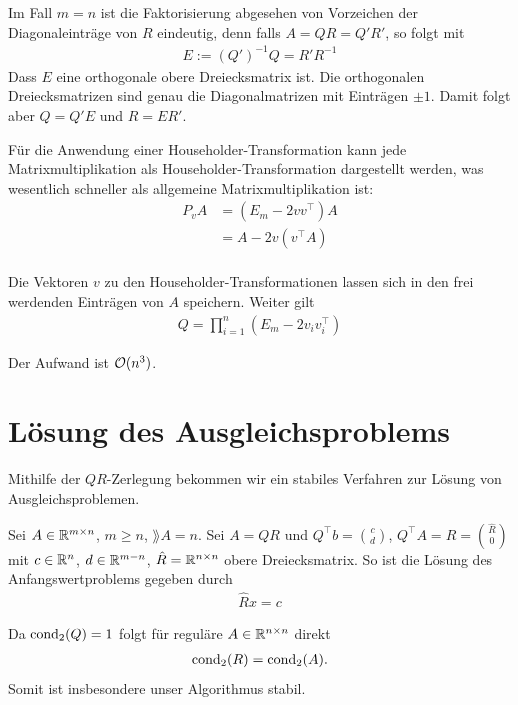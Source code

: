 \documentclass{report}
\begin{document}
\begin{anmerkung}
	Im Fall $m = n$ ist die Faktorisierung abgesehen von Vorzeichen der Diagonaleinträge von $R$ eindeutig, denn falls $A = QR = Q'R'$, so folgt mit
	\begin{align*}
		E := (Q')^{-1}Q = R'R^{-1}
	\end{align*}
	Dass $E$ eine orthogonale obere Dreiecksmatrix ist. Die orthogonalen Dreiecksmatrizen sind genau die Diagonalmatrizen mit Einträgen $\pm 1$. Damit folgt aber $Q = Q'E$ und $R = ER'$.
\end{anmerkung}
\begin{anmerkung}
	Für die Anwendung einer Householder-Transformation kann jede Matrixmultiplikation als Householder-Transformation dargestellt werden, was wesentlich schneller als allgemeine Matrixmultiplikation ist:
	\begin{align*}
		P_vA &= (E_m - 2vv^\top)A\\ 
			   &= A - 2v(v^\top A)\\
	\end{align*}
\end{anmerkung}
\begin{anmerkung}
	Die Vektoren $v$ zu den Householder-Transformationen lassen sich in den frei werdenden Einträgen von $A$ speichern. Weiter gilt
	\begin{align*}
		Q = \prod_{i = 1}^n (E_m - 2v_i v_i^\top)
	\end{align*}
\end{anmerkung}
\begin{anmerkung}
	Der Aufwand ist $\mathcal{O}(n^3)$.
\end{anmerkung}
\section{Lösung des Ausgleichsproblems}
Mithilfe der $QR$-Zerlegung bekommen wir ein stabiles Verfahren zur Lösung von Ausgleichsproblemen.
\begin{theorem}
	Sei $A \in \mathbb{R}^{m \times n}$, $m \geq n$, $\rang A = n$. Sei $A = QR$ und $Q^\top b = \binom{c}{d}$, $Q^\top A = R = \binom{\hat R}{0}$ mit $c \in \mathbb{R}^n$, $d \in \mathbb{R}^{m-n}$, $\hat R = \mathbb{R}^{n \times n}$ obere Dreiecksmatrix. So ist die Lösung des Anfangswertproblems gegeben durch
	\begin{align*}
		\hat R x = c
	\end{align*}
\end{theorem}
\begin{anmerkung}
	Da $\textnormal{cond}_2(Q) = 1$ folgt für reguläre $A \in \mathbb{R}^{n \times n}$ direkt 
	\begin{align*}
		\textnormal{cond}_2(R) = \textnormal{cond}_2(A).
	\end{align*}
	Somit ist insbesondere unser Algorithmus stabil.
\end{anmerkung}
\end{document}
